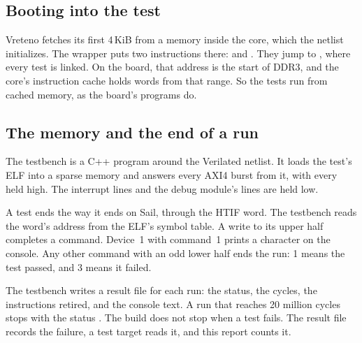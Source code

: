 \subsection{Booting into the test}

Vreteno fetches its first 4\,KiB from a memory inside the core, which
the netlist initializes. The wrapper puts two instructions there:
 and . They jump to
, where every test is linked. On the board, that
address is the start of DDR3, and the core's instruction cache holds
words from that range. So the tests run from cached memory, as the
board's programs do.

\subsection{The memory and the end of a run}

The testbench is a C++ program around the Verilated netlist. It loads
the test's ELF into a sparse memory and answers every AXI4 burst from
it, with every  held high. The interrupt lines and the
debug module's lines are held low.

A test ends the way it ends on Sail, through the HTIF 
word. The testbench reads the word's address from the ELF's symbol
table. A write to its upper half completes a command. Device~1 with
command~1 prints a character on the console. Any other command with an
odd lower half ends the run: 1 means the test passed, and 3 means it
failed.

The testbench writes a result file for each run: the status, the
cycles, the instructions retired, and the console text. A run that
reaches 20 million cycles stops with the status . The
build does not stop when a test fails. The result file records the
failure, a test target reads it, and this report counts it.
